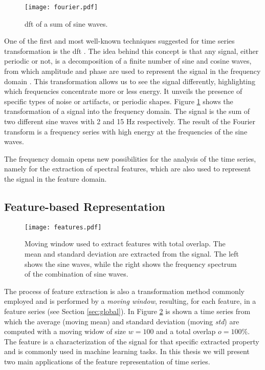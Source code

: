 \begin{figure}
    \centering
    \texttt{[image: fourier.pdf]}
    \caption{\gls{dft} of a sum of sine waves.}
    \label{fig:fourier}
\end{figure}

One of the first and most well-known techniques suggested for time series transformation is the \gls{dft} \cite{fourier}. The idea behind this concept is that any signal, either periodic or not, is a decomposition of a finite number of sine and cosine waves, from which amplitude and phase are used to represent the signal in the frequency domain \cite{fourier2}. This transformation allows us to see the signal differently, highlighting which frequencies concentrate more or less energy. It unveils the presence of specific types of noise or artifacts, or periodic shapes. Figure \ref{fig:fourier} shows the transformation of a signal into the frequency domain. The signal is the sum of two different sine waves with 2 and 15 Hz respectively. The result of the Fourier transform is a frequency series with high energy at the frequencies of the sine waves.

The frequency domain opens new possibilities for the analysis of the time series, namely for the extraction of spectral features, which are also used to represent the signal in the feature domain. 

\subsection{Feature-based Representation}
\label{subsec:features}

\begin{figure}[!h]
\centering
\texttt{[image: features.pdf]}
\caption{Moving window used to extract features with total overlap. The mean and standard deviation are extracted from the signal. The left shows the sine waves, while the right shows the frequency spectrum of the combination of sine waves.}
\label{fig:feature_intro}
\end{figure}

The process of feature extraction is also a transformation method commonly employed and is performed by a \textit{moving window}, resulting, for each feature, in a feature series (see Section \ref{sec:global}). In Figure \ref{fig:feature_intro} is shown a time series from which the average (moving mean) and standard deviation (moving \textit{std}) are computed with a moving widow of size $w=100$ and a total overlap $o=100\%$. The feature is a characterization of the signal for that specific extracted property and is commonly used in machine learning tasks. In this thesis we will present two main applications of the feature representation of time series.

